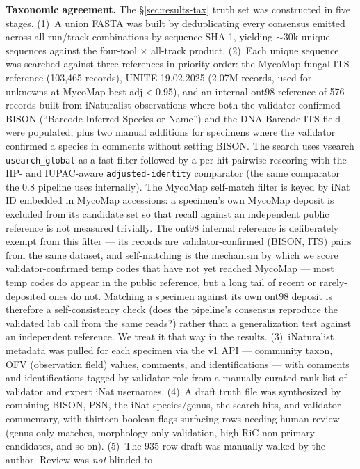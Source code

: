 \documentclass[11pt]{article}
\begin{document}
\textbf{Taxonomic agreement.} \label{sec:methods-tax} The
§\ref{sec:results-tax} truth set was constructed in five stages.
(1)~A union FASTA was built by deduplicating every consensus emitted
across all run/track combinations by sequence SHA-1, yielding $\sim$30k
unique sequences against the four-tool $\times$ all-track product.
(2)~Each unique sequence was searched against three references in
priority order: the MycoMap fungal-ITS reference (103,465 records),
UNITE 19.02.2025 (2.07M records, used for unknowns at MycoMap-best
adj$<$0.95), and an internal ont98 reference of 576 records built from
iNaturalist observations where both the validator-confirmed BISON
(``Barcode Inferred Species or Name'') and the DNA-Barcode-ITS field
were populated, plus two manual additions for specimens where the
validator confirmed a species in comments without setting BISON. The
search uses vsearch \texttt{usearch\_global} as a fast filter followed
by a per-hit pairwise rescoring with the HP- and IUPAC-aware
\texttt{adjusted-identity} comparator (the same comparator the 0.8
pipeline uses internally). The MycoMap self-match filter is keyed by
iNat ID embedded in MycoMap accessions: a specimen's own MycoMap
deposit is excluded from its candidate set so that recall against an
independent public reference is not measured trivially. The ont98
internal reference is deliberately exempt from this filter --- its
records are validator-confirmed (BISON, ITS) pairs from the same
dataset, and self-matching is the mechanism by which we score
validator-confirmed temp codes that have not yet reached MycoMap ---
most temp codes do appear in the public reference, but a long tail of
recent or rarely-deposited ones do not.
Matching a specimen against its own ont98 deposit is therefore a
self-consistency check (does the pipeline's consensus reproduce the
validated lab call from the same reads?) rather than a generalization
test against an independent reference. We treat it that way in the
results.
(3)~iNaturalist metadata was pulled for each specimen via the v1 API
--- community taxon, OFV (observation field) values, comments, and
identifications --- with comments and identifications tagged by
validator role from a manually-curated rank list of validator and
expert iNat usernames. (4)~A draft truth file was synthesized by
combining BISON, PSN, the iNat species/genus, the search hits, and
validator commentary, with thirteen boolean flags surfacing rows
needing human review (genus-only matches, morphology-only validation,
high-RiC non-primary candidates, and so on). (5)~The 935-row draft
was manually walked by the author. Review was \emph{not} blinded to
\end{document}
